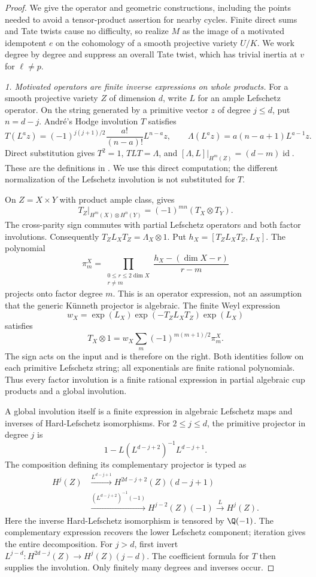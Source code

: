 \begin{proof}
We give the operator and geometric constructions, including the
points needed to avoid a tensor-product assertion for nearby cycles.
Finite direct sums and Tate twists cause no difficulty, so realize
$M$ as the image of a motivated idempotent $e$ on the cohomology
of a smooth projective variety $U/K$. We work degree by degree
and suppress an overall Tate twist, which has trivial inertia
at $v$ for $\ell\ne p$.

\emph{1. Motivated operators are finite inverse expressions on whole products.}
For a smooth projective variety $Z$ of dimension $d$, write $L$
for an ample Lefschetz operator. On the string generated by a
primitive vector $z$ of degree $j\leq d$, put $n=d-j$.
Andr\'e's Hodge involution $T$ satisfies
\[
 T(L^a z)=(-1)^{j(j+1)/2}\frac{a!}{(n-a)!}L^{n-a}z,
 \qquad
 \Lambda(L^a z)=a(n-a+1)L^{a-1}z.
\]
Direct substitution gives $T^2=1$, $TLT=\Lambda$, and
$[\Lambda,L]|_{H^m(Z)}=(d-m)\operatorname{id}$.
These are the definitions in
\citet[\S1.1, printed p.~10]{c_andre1996}.
We use this direct computation; the different normalization of
the Lefschetz involution is not substituted for $T$.

On $Z=X\times Y$ with product ample class,
\citet[Lemma~1.3.2, printed p.~13]{c_andre1996} gives
\[
 T_Z|_{H^m(X)\otimes H^n(Y)}
       =(-1)^{mn}(T_X\otimes T_Y).
\]
The cross-parity sign commutes with partial Lefschetz operators
and both factor involutions. Consequently
$T_ZL_XT_Z=\Lambda_X\otimes1$.
Put $h_X=[T_ZL_XT_Z,L_X]$. The polynomial
\[
 \pi_m^X=
 \prod_{\substack{0\leq r\leq2\dim X\\r\ne m}}
       \frac{h_X-(\dim X-r)}{r-m}
\]
projects onto factor degree $m$. This is an operator expression,
not an assumption that the generic K\"unneth projector is algebraic.
The finite Weyl expression
\[
 w_X=\exp(L_X)\exp(-T_ZL_XT_Z)\exp(L_X)
\]
satisfies
\[
 T_X\otimes1
     =w_X\sum_m(-1)^{m(m+1)/2}\pi_m^X.
\]
The sign acts on the input and is therefore on the right.
Both identities follow on each primitive Lefschetz string;
all exponentials are finite rational polynomials.
Thus every factor involution is a finite rational expression
in partial algebraic cup products and a global involution.

A global involution itself is a finite expression in algebraic
Lefschetz maps and inverses of Hard-Lefschetz isomorphisms.
For $2\leq j\leq d$, the primitive projector in degree $j$ is
\[
 1-L(L^{d-j+2})^{-1}L^{d-j+1}.
\]
The composition defining its complementary projector is typed as
\[
\begin{aligned}
 H^j(Z)&\xrightarrow{L^{d-j+1}}
 H^{2d-j+2}(Z)(d-j+1)\\
 &\xrightarrow{(L^{d-j+2})^{-1}(-1)}
 H^{j-2}(Z)(-1)\xrightarrow{L}H^j(Z).
\end{aligned}
\]
Here the inverse Hard-Lefschetz isomorphism is tensored by $\Q(-1)$.
The complementary expression recovers the lower Lefschetz component;
iteration gives the entire decomposition.
For $j>d$, first invert
$L^{j-d}:H^{2d-j}(Z)\to H^j(Z)(j-d)$.
The coefficient formula for $T$ then supplies the involution.
Only finitely many degrees and inverses occur.


\end{proof}
